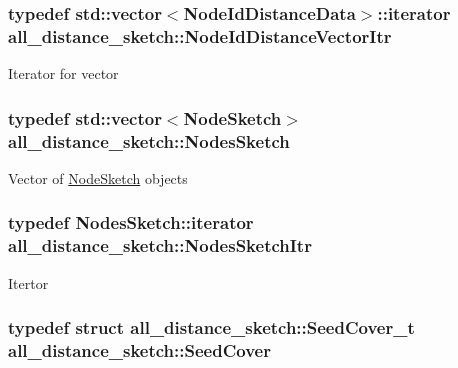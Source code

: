 \subsubsection[{Node\+Id\+Distance\+Vector\+Itr}]{\setlength{\rightskip}{0pt plus 5cm}typedef std\+::vector$<${\bf Node\+Id\+Distance\+Data}$>$\+::iterator {\bf all\+\_\+distance\+\_\+sketch\+::\+Node\+Id\+Distance\+Vector\+Itr}}\label{namespaceall__distance__sketch_aeb3aa8f88e2ff80d4625d227ad385dae}
Iterator for vector \hypertarget{namespaceall__distance__sketch_aa6fb9f0cba2c34476603e744606c5d6a}{}
\subsubsection[{Nodes\+Sketch}]{\setlength{\rightskip}{0pt plus 5cm}typedef std\+::vector$<${\bf Node\+Sketch}$>$ {\bf all\+\_\+distance\+\_\+sketch\+::\+Nodes\+Sketch}}\label{namespaceall__distance__sketch_aa6fb9f0cba2c34476603e744606c5d6a}
Vector of \hyperlink{classall__distance__sketch_1_1NodeSketch}{Node\+Sketch} objects \hypertarget{namespaceall__distance__sketch_aeb845b04fceda3cdfb3ee08ebf7c0103}{}
\subsubsection[{Nodes\+Sketch\+Itr}]{\setlength{\rightskip}{0pt plus 5cm}typedef Nodes\+Sketch\+::iterator {\bf all\+\_\+distance\+\_\+sketch\+::\+Nodes\+Sketch\+Itr}}\label{namespaceall__distance__sketch_aeb845b04fceda3cdfb3ee08ebf7c0103}
Itertor \hypertarget{namespaceall__distance__sketch_a2c159e46ed1a101b68cb2b23a58c4129}{}
\subsubsection[{Seed\+Cover}]{\setlength{\rightskip}{0pt plus 5cm}typedef struct {\bf all\+\_\+distance\+\_\+sketch\+::\+Seed\+Cover\+\_\+t}  {\bf all\+\_\+distance\+\_\+sketch\+::\+Seed\+Cover}}\label{namespaceall__distance__sketch_a2c159e46ed1a101b68cb2b23a58c4129}


